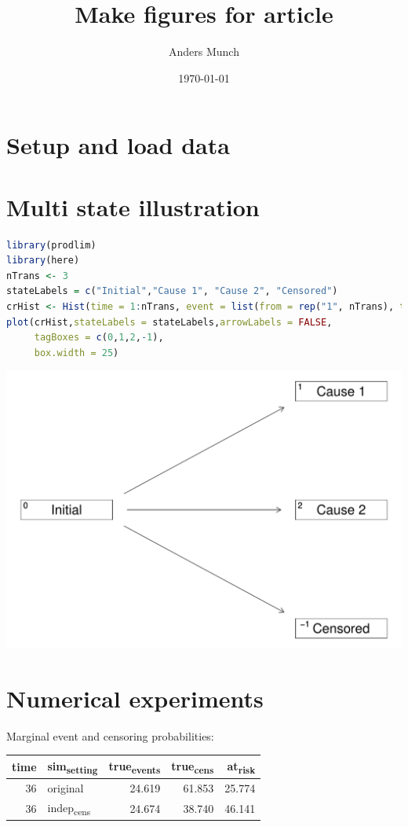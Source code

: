 \documentclass[11pt]{article}
\author{Anders Munch}
\date{\today}
\title{Make figures for article}
\begin{document}
\maketitle
\section{Setup and load data}
\label{sec:orge24a45c}
\section{Multi state illustration}
\label{sec:org6284f65}
\begin{lstlisting}[language=r,numbers=none]
library(prodlim)
library(here)
nTrans <- 3
stateLabels = c("Initial","Cause 1", "Cause 2", "Censored")
crHist <- Hist(time = 1:nTrans, event = list(from = rep("1", nTrans), to = stateLabels[-1]))
plot(crHist,stateLabels = stateLabels,arrowLabels = FALSE,
     tagBoxes = c(0,1,2,-1),
     box.width = 25) 
\end{lstlisting}

\begin{center}
\includegraphics[width=.9\linewidth]{figure-multi-state-process.pdf}
\label{}
\end{center}
\section{Numerical experiments}
\label{sec:orgcfd1849}
Marginal event and censoring probabilities:
\label{}
\begin{center}
\begin{tabular}{rlrrr}
time & sim\textsubscript{setting} & true\textsubscript{events} & true\textsubscript{cens} & at\textsubscript{risk}\\
\hline
36 & original & 24.619 & 61.853 & 25.774\\
36 & indep\textsubscript{cens} & 24.674 & 38.740 & 46.141\\
\end{tabular}
\end{center}
\end{document}
